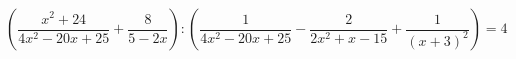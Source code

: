 \begin{ex}[type=equation]
	\begin{condition}
		$\left(\dfrac{x^2 + 24}{4x^2 - 20x + 25}+ \dfrac{8}{5 - 2x}\right) :\left(\dfrac{1}{4x^2 - 20x + 25} - \dfrac{2}{2x^2 + x-15} + \dfrac{1}{(x + 3)^2}\right) = 4$
	\end{condition}
\end{ex}